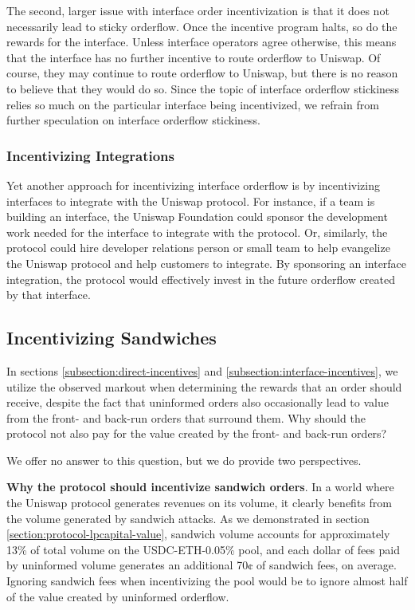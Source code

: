         The second, larger issue with interface order incentivization is that it does not necessarily lead to sticky orderflow. Once the incentive program halts, so do the rewards for the interface. Unless interface operators agree otherwise, this means that the interface has no further incentive to route orderflow to Uniswap. Of course, they may continue to route orderflow to Uniswap, but there is no reason to believe that they would do so. Since the topic of interface orderflow stickiness relies so much on the particular interface being incentivized, we refrain from further speculation on interface orderflow stickiness.


    \subsubsection{Incentivizing Integrations}
        Yet another approach for incentivizing interface orderflow is by incentivizing interfaces to integrate with the Uniswap protocol. For instance, if a team is building an interface, the Uniswap Foundation could sponsor the development work needed for the interface to integrate with the protocol. Or, similarly, the protocol could hire developer relations person or small team to help evangelize the Uniswap protocol and help customers to integrate. By sponsoring an interface integration, the protocol would effectively invest in the future orderflow created by that interface.

\subsection{Incentivizing Sandwiches}
    In sections \ref{subsection:direct-incentives} and \ref{subsection:interface-incentives}, we utilize the observed markout when determining the rewards that an order should receive, despite the fact that uninformed orders also occasionally lead to value from the front- and back-run orders that surround them. Why should the protocol not also pay for the value created by the front- and back-run orders?

    We offer no answer to this question, but we do provide two perspectives.

    \textbf{Why the protocol should incentivize sandwich orders}.
    In a world where the Uniswap protocol generates revenues on its volume, it clearly benefits from the volume generated by sandwich attacks. As we demonstrated in section \ref{section:protocol-lpcapital-value}, sandwich volume accounts for approximately 13\% of total volume on the USDC-ETH-0.05\% pool, and each dollar of fees paid by uninformed volume generates an additional 70¢ of sandwich fees, on average. Ignoring sandwich fees when incentivizing the pool would be to ignore almost half of the value created by uninformed orderflow.

